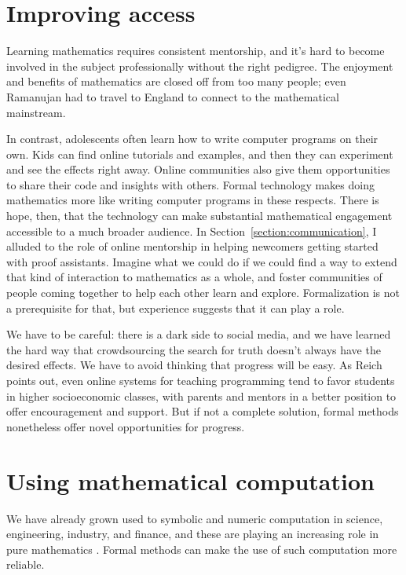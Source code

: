 \documentclass{amsart}
\theoremstyle{definition}
\theoremstyle{remark}
\numberwithin{equation}{section}
\begin{document}
\section{Improving access}

Learning mathematics requires consistent mentorship, and it's hard to become involved in the subject professionally without the right pedigree. The enjoyment and benefits of mathematics are closed off from too many people; even Ramanujan had to travel to England to connect to the mathematical mainstream.

In contrast, adolescents often learn how to write computer programs on their own. Kids can find online tutorials and examples, and then they can experiment and see the effects right away. Online communities also give them opportunities to share their code and insights with others. Formal technology makes doing mathematics more like writing computer programs in these respects. There is hope, then, that the technology can make substantial mathematical engagement accessible to a much broader audience. In Section~\ref{section:communication}, I alluded to the role of online mentorship in helping newcomers getting started with proof assistants. Imagine what we could do if we could find a way to extend that kind of interaction to mathematics as a whole, and foster communities of people coming together to help each other learn and explore. Formalization is not a prerequisite for that, but experience suggests that it can play a role.

We have to be careful: there is a dark side to social media, and we have learned the hard way that crowdsourcing the search for truth doesn't always have the desired effects. We have to avoid thinking that progress will be easy. As Reich points out, even online systems for teaching programming tend to favor students in higher socioeconomic classes, with parents and mentors in a better position to offer encouragement and support. But if not a complete solution, formal methods nonetheless offer novel opportunities for progress.


\section{Using mathematical computation}

We have already grown used to symbolic and numeric computation in science, engineering, industry, and finance, and these are playing an increasing role in pure mathematics \cite{cohn:et:al:17,hales:14,helfgott:15}. Formal methods can make the use of such computation more reliable.
\end{document}
